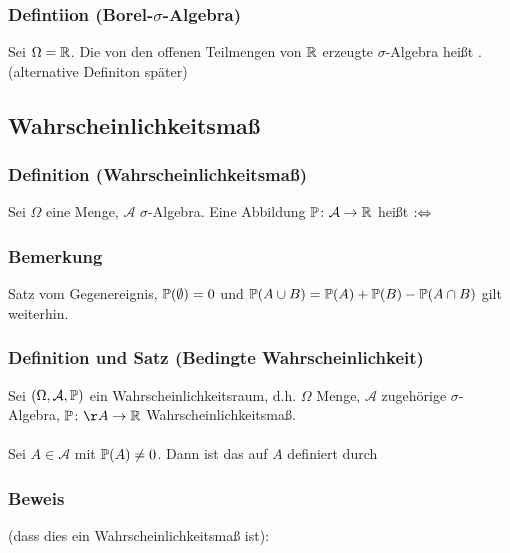 \subsubsection{Defintiion (Borel-$\sigma$-Algebra)}
Sei $\Omega=\mathbb{R}$. Die von den offenen Teilmengen von $\mathbb{R}$ erzeugte $\sigma$-Algebra hei\ss{}t . (alternative Definiton sp\"ater)
\subsection{Wahrscheinlichkeitsma\ss{}}
\subsubsection{Definition (Wahrscheinlichkeitsma\ss{})}
Sei $\Omega$ eine Menge, $\mathcal{A}$ $\sigma$-Algebra. Eine Abbildung $\mathbb{P}\colon\mathcal{A}\to\mathbb{R}$ hei\ss{}t  $:\Leftrightarrow$
\subsubsection{Bemerkung}
Satz vom Gegenereignis, $\mathbb{P}(\emptyset)=0$ und $\mathbb{P}(A\cup B)=\mathbb{P}(A)+\mathbb{P}(B)-\mathbb{P}(A\cap B)$ gilt weiterhin.
\subsubsection{Definition und Satz (Bedingte Wahrscheinlichkeit)}
Sei $(\Omega,\mathcal{A},\mathbb{P})$ ein Wahrscheinlichkeitsraum, d.h. $\Omega$ Menge, $\mathcal{A}$ zugeh\"orige $\sigma$-Algebra, $\PP\colon\AA\to\RR$ Wahrscheinlichkeitsma\ss{}.
\\~\\
Sei $A\in\mathcal{A}$ mit $\mathbb{P}(A)\neq0$. Dann ist das auf $A$  definiert durch
\subsubsection{Beweis}
(dass dies ein Wahrscheinlichkeitsma\ss{} ist):
